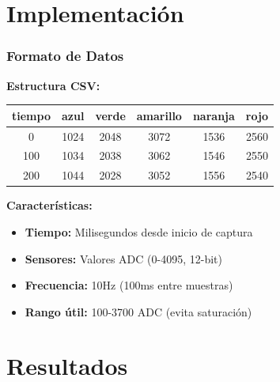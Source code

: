 \documentclass[xcolor=dvipsnames]{beamer}
\begin{document}
\begin{frame}
\begin{columns}
\begin{column}{0.4\textwidth}
        \end{column}
    \end{columns}
\end{frame}

\section{Implementación}

\begin{frame}
    \frametitle{Formato de Datos}
    \textbf{Estructura CSV:}
    \begin{center}
        \begin{tabular}{|c|c|c|c|c|c|}
            \hline
            \textbf{tiempo} & \textbf{azul} & \textbf{verde} & \textbf{amarillo} & \textbf{naranja} & \textbf{rojo} \\
            \hline
            0 & 1024 & 2048 & 3072 & 1536 & 2560 \\
            100 & 1034 & 2038 & 3062 & 1546 & 2550 \\
            200 & 1044 & 2028 & 3052 & 1556 & 2540 \\
            \hline
        \end{tabular}
    \end{center}
    
    \vspace{0.5cm}
    \textbf{Características:}
    \begin{itemize}
        \item \textbf{Tiempo:} Milisegundos desde inicio de captura
        \item \textbf{Sensores:} Valores ADC (0-4095, 12-bit)
        \item \textbf{Frecuencia:} 10Hz (100ms entre muestras)
        \item \textbf{Rango útil:} 100-3700 ADC (evita saturación)
    \end{itemize}
\end{frame}

\section{Resultados}
\end{document}
